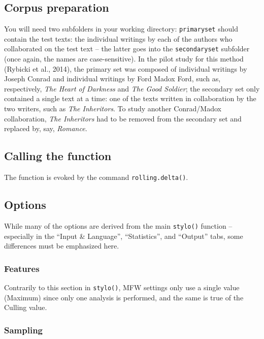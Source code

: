 \documentclass[11pt,a4paper]{article}
\def\underscore{\raisebox{-.8ex}{-}}
\def\code#1{{\tt #1}}
\begin{document}
\subsection{Corpus preparation}

You will need two subfolders in your working directory: \code{primary\underscore{}set}
should contain the test texts: the individual writings by each of
the authors who collaborated on the test text -- the latter goes into
the \code{secondary\underscore{}set} subfolder (once again, the names are case-sensitive).
In the pilot study for this method (Rybicki et al., 2014), the primary
set was composed of individual writings by Joseph Conrad and individual
writings by Ford Madox Ford, such as, respectively, \emph{The Heart
of Darkness} and \emph{The Good Soldier}; the secondary set only contained
a single text at a time: one of the texts written in collaboration
by the two writers, such as \emph{The Inheritors}. To study another
Conrad/Madox collaboration, \emph{The Inheritors} had to be removed
from the secondary set and replaced by, say, \emph{Romance}.


\subsection{Calling the function}

The function is evoked by the command \code{rolling.delta()}.


\subsection{Options}

While many of the options are derived from the main \code{stylo()} function
-- especially in the ``Input \& Language'', ``Statistics'', and
``Output'' tabs, some differences must be emphasized here.


\subsubsection{Features}

Contrarily to this section in \code{stylo()}, MFW settings only
use a single value (Maximum) since only one analysis is performed,
and the same is true of the Culling value.


\subsubsection{Sampling}
\end{document}
